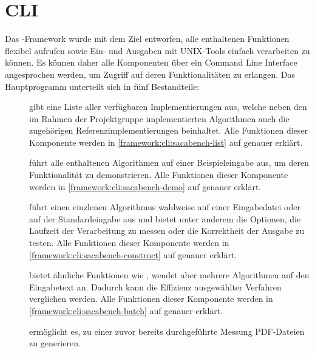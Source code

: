 \section{CLI}

Das  \sacabench-Framework wurde mit dem Ziel entworfen, alle enthaltenen Funktionen flexibel aufrufen sowie Ein- und Ausgaben mit UNIX-Tools einfach verarbeiten zu können.
Es können daher alle Komponenten über ein Command Line Interface angesprochen werden, um Zugriff auf deren Funktionalitäten zu erlangen.
Das Hauptprogramm unterteilt sich in fünf Bestandteile:
\begin{description}
    \item[] gibt eine Liste aller verfügbaren Implementierungen aus, welche neben den im Rahmen der Projektgruppe implementierten Algorithmen auch die zugehörigen Referenzimplementierungen beinhaltet.
        Alle Funktionen dieser Komponente werden in \cref{framework:cli:sacabench-list} auf  genauer erklärt.
    \item[] führt alle enthaltenen Algorithmen auf einer Beispieleingabe aus, um deren Funktionalität zu demonstrieren.
        Alle Funktionen dieser Komponente werden in \cref{framework:cli:sacabench-demo} auf  genauer erklärt.
    \item[] führt einen einzlenen Algorithmus wahlweise auf einer Eingabedatei oder auf der Standardeingabe aus und bietet unter anderem die Optionen, die Laufzeit der Verarbeitung zu messen oder die Korrektheit der Ausgabe zu testen. Alle Funktionen dieser Komponente werden in \cref{framework:cli:sacabench-construct} auf  genauer erklärt.
    \item[] bietet ähnliche Funktionen wie , wendet aber mehrere Algorithmen auf den Eingabetext an. Dadurch kann die Effizienz ausgewählter Verfahren verglichen werden. Alle Funktionen dieser Komponente werden in \cref{framework:cli:sacabench-batch} auf  genauer erklärt.
    \item[] ermöglicht es, zu einer zuvor bereits durchgeführte Messung PDF-Dateien zu generieren.
\end{description}







